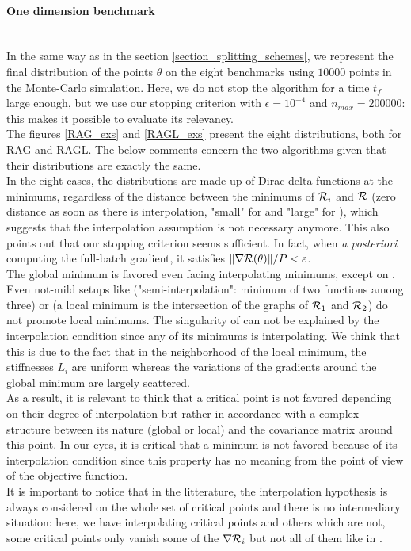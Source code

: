 \paragraph{One dimension benchmark}
~~\\
In the same way as in the section \ref{section_splitting_schemes}, we represent the final distribution of the points $\theta$ on the eight benchmarks using $10000$ points in the Monte-Carlo simulation. Here, we do not stop the algorithm for a time $t_f$ large enough, but we use our stopping criterion with $\epsilon=10^{-4}$ and $n_{max}=200000$: this makes it possible to evaluate its relevancy. 
\\
The figures \ref{RAG_exs} and \ref{RAGL_exs} present the eight distributions, both for RAG and RAGL. The below comments concern the two algorithms given that their distributions are exactly the same.\\
In the eight cases, the distributions are made up of Dirac delta functions at the minimums, regardless of the distance between the minimums of $\mathcal{R}_i$ and $\mathcal{R}$ (zero distance as
soon as there is interpolation, "small" for \exThree and "large" for \exFour), which suggests that the interpolation assumption is not necessary anymore. This also points out that
our stopping criterion seems sufficient. In fact, when {\em a posteriori} computing the full-batch gradient, it satisfies $\|\nabla \mathcal{R}(\theta)\|/P<\varepsilon$. \\
The global minimum is favored even facing interpolating minimums, except on \exHeight. Even not-mild setups like \exSix ("semi-interpolation": minimum of two functions among three) or \exThree (a local minimum is the intersection of the graphs of $\mathcal{R}_1$ and $\mathcal{R}_2$) do not promote local minimums. The singularity of \exHeight can not be explained by the interpolation condition since any of its minimums is interpolating. We think that this is due to the fact that in the neighborhood of the local minimum, the stiffnesses $L_i$ are uniform whereas the variations of the gradients around the global minimum are largely scattered. \\
As a result, it is relevant to think that a critical point is not favored depending on their degree of interpolation but rather in accordance with a complex structure between its nature (global or local) and the covariance matrix around this point. In our eyes, it is critical that a minimum is not favored because of its interpolation condition since this property has no meaning from the point of view of the objective function. \\
It is important to notice that in the litterature, the interpolation hypothesis is always considered on the whole set of critical points and there is no intermediary situation:
here, we have interpolating critical points and others which are not, some critical points only vanish some of the $\nabla \mathcal{R}_i$ but not all of them like in \exSix.     


